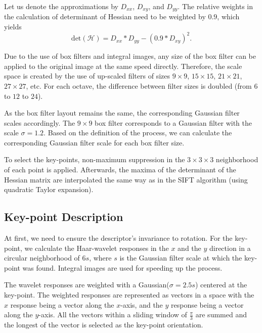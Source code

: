 Let us denote the approximations by $D_{xx}$, $D_{xy}$, and $D_{yy}$. The relative weights in the calculation of determinant of Hessian need to be weighted by $0.9$, which yields
\begin{equation}
    \text{det}(\mathcal{H}) = D_{xx} * D_{yy} - (0.9 * D_{xy})^{2}.
\end{equation}

Due to the use of box filters and integral images, any size of the box filter can be applied to the original image at the same speed directly. Therefore, the scale space is created by the use of up-scaled filters of sizes $9\times9$, $15\times15$, $21\times21$, $27\times27$, etc. For each octave, the difference between filter sizes is doubled (from $6$ to $12$ to $24$).

As the box filter layout remains the same, the corresponding Gaussian filter scales accordingly. The $9\times9$ box filter corresponds to a Gaussian filter with the scale $\sigma = 1.2$. Based on the definition of the process, we can calculate the corresponding Gaussian filter scale for each box filter size.

To select the key-points, non-maximum suppression in the $3\times3\times3$ neighborhood of each point is applied. Afterwards, the maxima of the determinant of the Hessian matrix are interpolated the same way as in the SIFT algorithm (using quadratic Taylor expansion).

\subsection{Key-point Description}
At first, we need to ensure the descriptor's invariance to rotation. For the key-point, we calculate the Haar-wavelet responses in the $x$ and the $y$ direction in a circular neighborhood of $6s$, where $s$ is the Gaussian filter scale at which the key-point was found. Integral images are used for speeding up the process.

The wavelet responses are weighted with a Gaussian($\sigma = 2.5 s$) centered at the key-point. The weighted responses are represented as vectors in a space with the $x$ response being a vector along the $x$-axis, and the $y$ response being a vector along the $y$-axis. All the vectors within a sliding window of $\frac{\pi}{3}$ are summed and the longest of the vector is selected as the key-point orientation.

